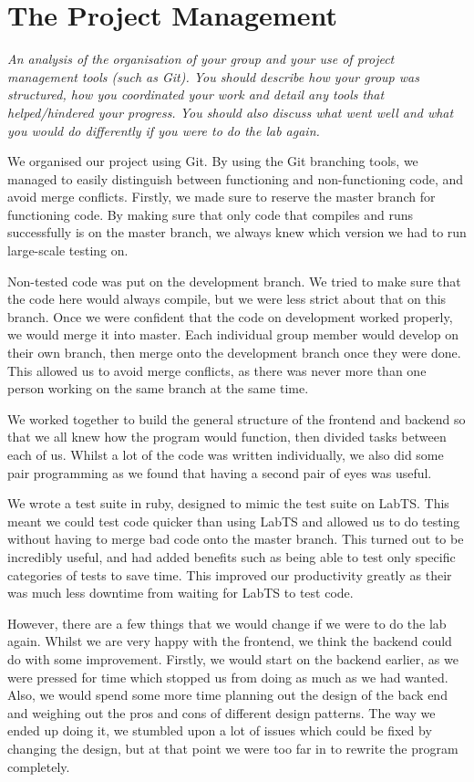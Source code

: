 \documentclass[]{article}
\newcommand{\spec}[1]{\textit{#1}\par\noindent}
\begin{document}
\section{The Project Management}
\spec{An analysis of the organisation of your group and your use of project management tools (such as Git). You should describe how your group was structured, how you coordinated your work and detail any tools that helped/hindered your progress. You should also discuss what went well and what you would do differently if you were to do the lab again.}
We organised our project using Git. By using the Git branching tools, we managed to easily distinguish between functioning and non-functioning code, and avoid merge conflicts. Firstly, we made sure to reserve the master branch for functioning code. By making sure that only code that compiles and runs successfully is on the master branch, we always knew which version we had to run large-scale testing on.

Non-tested code was put on the development branch. We tried to make sure that the code here would always compile, but we were less strict about that on this branch. Once we were confident that the code on development worked properly, we would merge it into master. Each individual group member would develop on their own branch, then merge onto the development branch once they were done. This allowed us to avoid merge conflicts, as there was never more than one person working on the same branch at the same time. 

We worked together to build the general structure of the frontend and backend so that we all knew how the program would function, then divided tasks between each of us. Whilst a lot of the code was written individually, we also did some pair programming as we found that having a second pair of eyes was useful.

We wrote a test suite in ruby, designed to mimic the test suite on LabTS. This meant we could test code quicker than using LabTS and allowed us to do testing without having to merge bad code onto the master branch. This turned out to be incredibly useful, and had added benefits such as being able to test only specific categories of tests to save time. This improved our productivity greatly as their was much less downtime from waiting for LabTS to test code.

However, there are a few things that we would change if we were to do the lab again. Whilst we are very happy with the frontend, we think the backend could do with some improvement. Firstly, we would start on the backend earlier, as we were pressed for time which stopped us from doing as much as we had wanted. Also, we would spend some more time planning out the design of the back end and weighing out the pros and cons of different design patterns. The way we ended up doing it, we stumbled upon a lot of issues which could be fixed by changing the design, but at that point we were too far in to rewrite the program completely.
\end{document}
